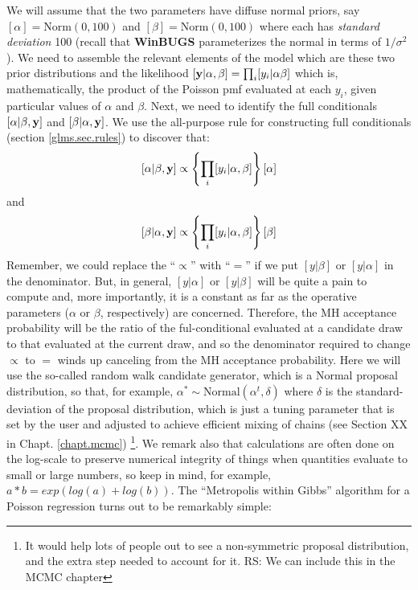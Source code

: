 We will assume that the two parameters have diffuse
normal priors, say $[\alpha] = \mbox{Norm}(0,100)$ and
$[\beta]=\mbox{Norm}(0,100)$ where each has {\it standard deviation}
100 (recall that {\bf WinBUGS} parameterizes the normal in terms of $1/\sigma^{2}$).
We need to assemble the relevant elements of the model which are these
two prior distributions and the
likelihood $[{\bf y}|\alpha,\beta] = \prod_{i} [y_i|\alpha \beta] $ which is,
mathematically, the product of the Poisson pmf evaluated at each $y_i$,
given particular values of $\alpha$ and $\beta$.
Next, we need to identify the full conditionals
$[\alpha|\beta, {\bf y}]$ and $[\beta|\alpha,{\bf y}]$.  We use the all-purpose
rule for constructing full conditionals
(section \ref{glms.sec.rules})
 to discover that:
\[
 [\alpha|\beta,{\bf y}] \propto \left\{ \prod_{i} [y_{i}|\alpha,\beta]\right\}[\alpha]
\]
and
\[
 [\beta|\alpha,{\bf y}] \propto \left\{ \prod_{i}
   [y_{i}|\alpha,\beta]\right\} [\beta]
\]
Remember, we could replace the ``$\propto$'' with ``$=$'' if we
put $[y|\beta]$ or $[y|\alpha]$ in the denominator. But, in general,
$[y|\alpha]$ or $[y|\beta]$ will be quite a pain to compute and, more
importantly, it is a constant as far as the operative parameters
($\alpha$ or $\beta$,
respectively) are concerned. Therefore,
the MH acceptance probability will be the ratio of the
ful-conditional evaluated at a candidate draw to that evaluated at the
current draw, and so the denominator required to change $\propto$ to $=$
winds up canceling from the MH acceptance probability.
Here we will
use the so-called random walk candidate generator, which is a Normal proposal distribution, so that, for example,
 $\alpha^{*} \sim \mbox{Normal}(\alpha^{t},\delta)$ where $\delta$ is
 the standard-deviation of the proposal distribution, which is just a
 tuning parameter that is set by the user and adjusted to achieve efficient mixing of chains (see Section XX in Chapt. \ref{chapt.mcmc}) \footnote{
It would help
lots of people out to see a non-symmetric proposal distribution, and
the extra step needed to account for it. RS: We can include this in the MCMC chapter
}.
We remark also that calculations are often done on the log-scale to
preserve numerical integrity of things when quantities evaluate to
small or large numbers, so keep in mind, for example,
$a*b = exp(log(a) + log(b))$.
 The ``Metropolis within
Gibbs'' algorithm for a Poisson regression turns out to be  remarkably simple:

